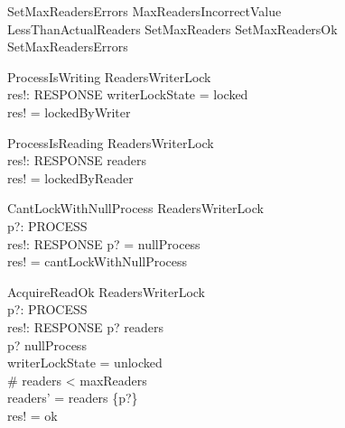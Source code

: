 \documentclass{article}
\begin{document}


\begin{zed}
SetMaxReadersErrors  MaxReadersIncorrectValue  \\
\quad \lor LessThanActualReaders
\also
SetMaxReaders  SetMaxReadersOk \lor SetMaxReadersErrors
\end{zed}

\begin{schema}{ProcessIsWriting}
    \Xi ReadersWriterLock \\
    res!: RESPONSE
\where
    writerLockState = locked \\
    res! = lockedByWriter
\end{schema}

\begin{schema}{ProcessIsReading}
    \Xi ReadersWriterLock \\
    res!: RESPONSE
\where
    readers \neq \emptyset \\
    res! = lockedByReader
\end{schema}

\begin{schema}{CantLockWithNullProcess}
    \Xi ReadersWriterLock \\
    p?: PROCESS \\
    res!: RESPONSE
\where
    p? = nullProcess \\
    res! = cantLockWithNullProcess
\end{schema}

\begin{schema}{AcquireReadOk}
    \Delta ReadersWriterLock \\
    p?: PROCESS \\
    res!: RESPONSE
\where
    p? \notin readers \\
    p? \neq nullProcess \\
    writerLockState = unlocked \\
    \# readers < maxReaders \\
    readers' = readers \cup \{p?\} \\
    res! = ok
\end{schema}
\end{document}
